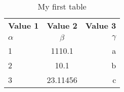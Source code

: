 \documentclass{article}
\begin{document}
\begin{table}[h!]
    \begin{center}
        \caption{My first table}
        \label{tab:table1}
        \begin{tabular}{l|c|r}
            \textbf{Value 1} & \textbf{Value 2} & \textbf{Value 3}\\
            $\alpha$ & $\beta$ & $\gamma$ \\
            \hline
            1 & 1110.1 & a\\
            2 & 10.1 & b\\
            3 & 23.11456 & c\\
        \end{tabular}
    \end{center}    
\end{table}
\end{document}
